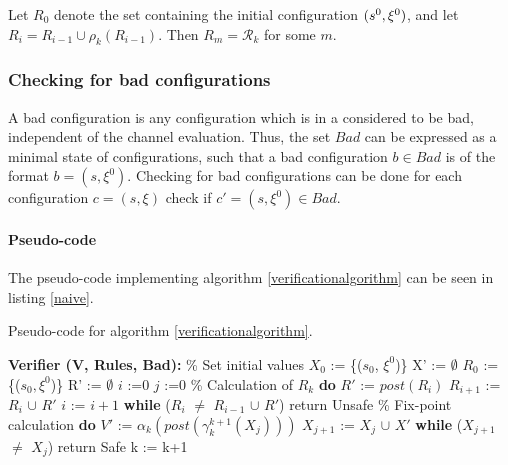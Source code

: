 Let $R_0$ denote the set containing the initial configuration $(s^0, \xi^0)$, and let $R_i = R_{i-1} \cup \rho_k(R_{i-1})$. Then $R_m = \mathcal{R}_k$ for some $m$.

\subsubsection{Checking for bad configurations}
\label{part3}
A bad configuration is any configuration which is in a  considered to be bad, independent of the channel evaluation. Thus, the set $Bad$ can be expressed as a minimal state of configurations, such that a bad configuration $b \in Bad$ is of the format $b = (s, \xi^0)$. Checking for bad configurations can be done for each configuration $c = (s, \xi)$ check if $c' = (s, \xi^0) \in Bad$.


\paragraph{Pseudo-code}
The pseudo-code implementing algorithm \ref{verificationalgorithm} can be seen in listing \ref{naive}. 

\begin{algorithm}
  \caption{Pseudo-code for algorithm \ref{verificationalgorithm}.}
	\label{naive}
  \begin{algorithmic}[1]
    \State \textbf{Verifier (V, Rules, Bad):}
	\State \% Set initial values
	\State $X_0$ := \{($s_0$, $\xi^0$)\}
	\State X' := $\emptyset$
	\State $R_0$ := \{($s_0, \xi^0$)\}
	\State R' := $\emptyset$
	\State $i$ :=$0$
	\State $j$ :=$0$
	\State
	\State \% Calculation of $R_k$
	\State \textbf{do}
        \State \hspace{10pt} $R'$ := $post(R_i)$
	\State \hspace{10pt} $R_{i+1}$ := $R_i$ $\cup$ $R'$
	\State \hspace{10pt} $i$ := $i+1$
	\State \textbf{while} ($R_i$ $\neq$ $R_{i-1}$ $\cup$ $R'$)
        \State return Unsafe
        \EndIf 
	\State 
	\State \% Fix-point calculation
	\State \textbf{do}
        \State \hspace{10pt} $V'$ := $\alpha_k(post(\gamma_k^{k+1}(X_j)))$
	\State \hspace{10pt} $X_{j+1}$ := $X_j$ $\cup$ $X'$
	\State \hspace{10pt} \textbf{while} ($X_{j+1}$ $\neq$ $X_j$)
        \State return Safe
        \EndIf
        \State k := k+1
      \EndFor
\end{algorithmic}
\end{algorithm}

